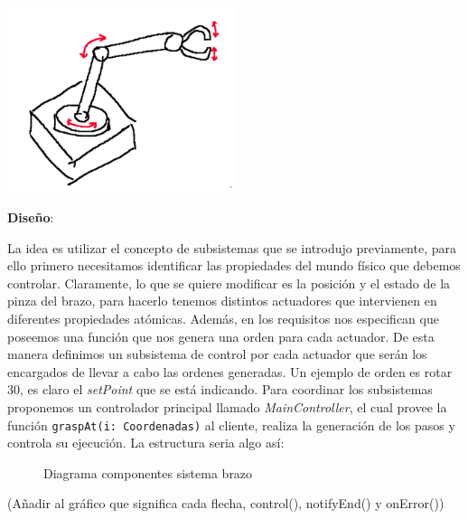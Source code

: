 \begin{centering}
{\includegraphics[width=0.5\textwidth]{Screenshot from 2024-08-29 18-44-50.png}\par}
\end{centering}

\textbf{Diseño}:

La idea es utilizar el concepto de subsistemas que se introdujo previamente, para ello primero necesitamos identificar las propiedades del mundo físico que debemos controlar. Claramente, lo que se quiere modificar es la posición y el estado de la pinza del brazo, para hacerlo tenemos distintos actuadores que intervienen en diferentes propiedades atómicas. Además, en los requisitos nos especifican que poseemos una función que nos genera una orden para cada actuador. De esta manera definimos un subsistema de control por cada actuador que serán los encargados de llevar a cabo las ordenes generadas. Un ejemplo de orden es rotar 30\textdegree, es claro el \textit{setPoint} que se está indicando. Para coordinar los subsistemas proponemos un controlador principal llamado \textit{MainController}, el cual provee la función \verb|graspAt(i: Coordenadas)| al cliente, realiza la generación de los pasos y controla su ejecución. La estructura seria algo así:


\begin{figure}[h]
\caption{Diagrama componentes sistema brazo}
\begin{center}
\end{center}
\end{figure}
(Añadir al gráfico que significa cada flecha, control(), notifyEnd() y onError())

